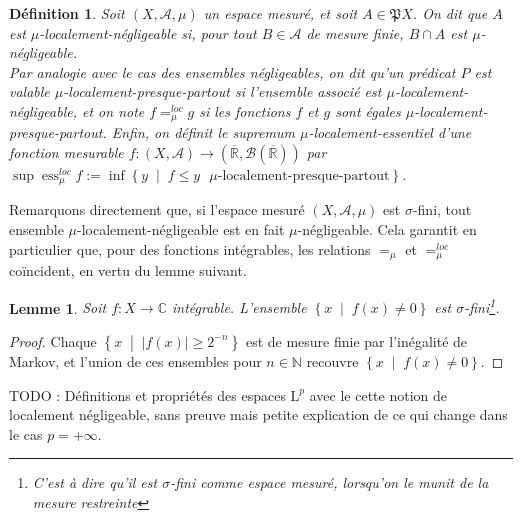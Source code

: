 \documentclass[a4paper,12pt]{article}
\newtheorem{definition}[theorem]{Définition}
\newtheorem{lemma}[theorem]{Lemme}
\newcommand{\R}{\mathbb{R}}
\newcommand{\N}{\mathbb{N}}
\newcommand{\C}{\mathbb{C}}
\newcommand{\Bor}{\mathcal{B}}
\newcommand{\abs}[1]{\left\vert#1\right\vert}
\newcommand{\set}[1]{\left\{ #1 \right\}}
\newcommand{\tq}{\;\middle|\;}
\newcommand{\parts}{\mathfrak{P}}
\newcommand{\TODO}[1]{{\color{red}TODO :} #1}
\DeclareMathOperator{\ess}{ess}
\begin{document}
\begin{definition}\label{loc_negligible}
    Soit $(X, \mathcal{A}, \mu)$ un espace mesuré, et soit $A\in\parts{X}$. On dit que $A$ est \emph{$\mu$-localement-négligeable} 
    si, pour tout $B\in\mathcal{A}$ \emph{de mesure finie}, $B\cap A$ est $\mu$-négligeable. \\
    Par analogie avec le cas des ensembles négligeables, on dit qu'un prédicat $P$ est valable 
    \emph{$\mu$-localement-presque-partout} si l'ensemble associé est $\mu$-localement-négligeable,
    et on note $f =_\mu^{loc} g$ si les fonctions $f$ et $g$ sont égales $\mu$-localement-presque-partout.
    Enfin, on définit le \emph{supremum $\mu$-localement-essentiel} d'une fonction mesurable $f:(X, \mathcal{A})\to(\overline{\R},\Bor(\overline{\R}))$ par 
    $\sup\ess_\mu^{loc} f := \inf\set{y\tq f\le y\text{ $\mu$-localement-presque-partout}}$.
\end{definition}

Remarquons directement que, si l'espace mesuré $(X, \mathcal{A}, \mu)$ est $\sigma$-fini, 
tout ensemble $\mu$-localement-négligeable est en fait $\mu$-négligeable. Cela garantit en particulier que, 
pour des fonctions intégrables, les relations $=_\mu$ et $=_\mu^{loc}$ coïncident, en vertu du lemme suivant.

\begin{lemma}
    Soit $f:X\to\C$ intégrable. L'ensemble $\set{x\tq f(x)\ne 0}$ est $\sigma$-fini\footnote{C'est à dire qu'il est $\sigma$-fini comme espace mesuré, 
    lorsqu'on le munit de la mesure restreinte}. 
\end{lemma}

\begin{proof}
    Chaque $\set{x\tq \abs{f(x)}\ge 2^{-n}}$ est de mesure finie par l'inégalité de Markov, et l'union de ces ensembles pour 
    $n\in\N$ recouvre $\set{x\tq f(x)\ne 0}$.
\end{proof}

\TODO{Définitions et propriétés des espaces $\mathrm{L}^p$ avec le cette notion de localement négligeable, 
sans preuve mais petite explication de ce qui change dans le cas $p=+\infty$.}
\end{document}
